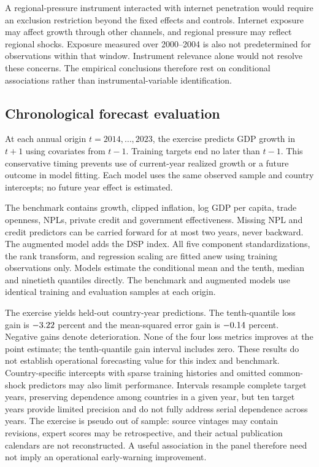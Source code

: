A regional-pressure instrument interacted with internet penetration would
require an exclusion restriction beyond the fixed effects and controls.
Internet exposure may affect growth through other channels, and regional
pressure may reflect regional shocks. Exposure measured over 2000--2004 is
also not predetermined for observations within that window. Instrument
relevance alone would not resolve these concerns. The empirical conclusions
therefore rest on conditional associations rather than instrumental-variable
identification.

\subsection{Chronological forecast evaluation}\label{subsec:forecast}
At each annual origin $t=2014,\ldots,2023$, the exercise predicts GDP growth
in $t+1$ using covariates from $t-1$. Training targets end no later than
$t-1$. This conservative timing prevents use of current-year realized growth
or a future outcome in model fitting. Each model uses the same observed
sample and country intercepts; no future year effect is estimated.

The benchmark contains growth, clipped inflation, log GDP per capita, trade
openness, NPLs, private credit and government effectiveness. Missing NPL and
credit predictors can be carried forward for at most two years, never
backward. The augmented model adds the DSP index. All five component
standardizations, the rank transform, and regression scaling are fitted anew
using training observations only. Models estimate the conditional mean and
the tenth, median and ninetieth quantiles directly. The benchmark and augmented
models use identical training and evaluation samples at each origin.


The exercise yields \ForecastN{} held-out country-year predictions.
The tenth-quantile loss gain is $-3.22$ percent and the mean-squared
error gain is $-0.14$ percent. Negative gains denote deterioration. None of the four loss metrics
improves at the point estimate; the tenth-quantile gain interval includes
zero. These results do not establish operational forecasting value for this
index and benchmark. Country-specific intercepts with sparse training
histories and omitted common-shock predictors may also limit performance.
Intervals resample complete target years, preserving dependence among
countries in a given year, but ten target years provide limited precision
and do not fully address serial dependence across years. The exercise is
pseudo out of sample: source vintages may contain revisions, expert scores
may be retrospective, and their actual publication calendars are not
reconstructed. A useful association in the panel therefore need not imply
an operational early-warning improvement.
